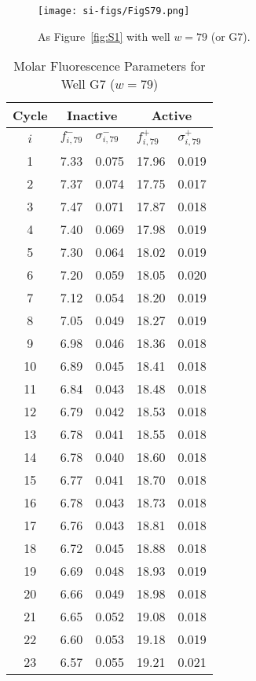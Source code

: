                 \begin{figure}
                    \centering
                    \texttt{[image: si-figs/FigS79.png]}
                    \caption{
                        As Figure~\ref{fig:S1} with well $w=79$ (or G7).
                    }
                \end{figure}
                \clearpage
    \begin{table}
        \caption{Molar Fluorescence Parameters for Well G7 ($w=79$)}
        \centering
        \begin{tabular}{c|ll|ll}
            Cycle & \multicolumn{2}{c|}{Inactive} & \multicolumn{2}{c}{Active} \\
            \hline
            $i$ & $f_{i,79}^{-}$ & $\sigma_{i,79}^{-}$ &  $f_{i,79}^{+}$ & $\sigma_{i,79}^{+}$ \\
            \hline
    1 & 7.33 & 0.075 & 17.96 & 0.019 \\
2 & 7.37 & 0.074 & 17.75 & 0.017 \\
3 & 7.47 & 0.071 & 17.87 & 0.018 \\
4 & 7.40 & 0.069 & 17.98 & 0.019 \\
5 & 7.30 & 0.064 & 18.02 & 0.019 \\
6 & 7.20 & 0.059 & 18.05 & 0.020 \\
7 & 7.12 & 0.054 & 18.20 & 0.019 \\
8 & 7.05 & 0.049 & 18.27 & 0.019 \\
9 & 6.98 & 0.046 & 18.36 & 0.018 \\
10 & 6.89 & 0.045 & 18.41 & 0.018 \\
11 & 6.84 & 0.043 & 18.48 & 0.018 \\
12 & 6.79 & 0.042 & 18.53 & 0.018 \\
13 & 6.78 & 0.041 & 18.55 & 0.018 \\
14 & 6.78 & 0.040 & 18.60 & 0.018 \\
15 & 6.77 & 0.041 & 18.70 & 0.018 \\
16 & 6.78 & 0.043 & 18.73 & 0.018 \\
17 & 6.76 & 0.043 & 18.81 & 0.018 \\
18 & 6.72 & 0.045 & 18.88 & 0.018 \\
19 & 6.69 & 0.048 & 18.93 & 0.019 \\
20 & 6.66 & 0.049 & 18.98 & 0.018 \\
21 & 6.65 & 0.052 & 19.08 & 0.018 \\
22 & 6.60 & 0.053 & 19.18 & 0.019 \\
23 & 6.57 & 0.055 & 19.21 & 0.021 \\

\end{tabular}
\end{table}
